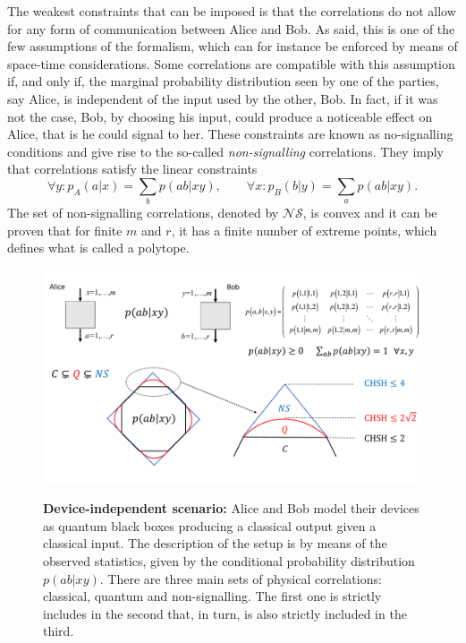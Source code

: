 \documentclass[a4paper]{article}
\begin{document}
The weakest constraints that can be imposed is that the correlations do not allow for any form of communication between Alice and Bob. As said, this is one of the few assumptions of the formalism, which can for instance be enforced by means of space-time considerations. Some correlations are compatible with this assumption if, and only if, the marginal probability distribution seen by one of the parties, say Alice, is independent of the input used by the other, Bob. In fact, if it was not the case, Bob, by choosing his input, could produce a noticeable effect on Alice, that is he could signal to her. These constraints  are known as no-signalling conditions and give rise to the so-called \emph{non-signalling} correlations. They imply that correlations satisfy the linear constraints
\begin{equation}
\label{nscorrelations}
\forall y: p_A(a|x)=\sum_b p(ab|xy), \quad\quad
\forall x: p_B(b|y)=\sum_a p(ab|xy).
\end{equation}
The set of non-signalling correlations, denoted by $\mathcal{NS}$, is convex and it can be proven that for finite $m$ and $r$, it has a finite number of extreme points, which defines what is called a polytope.

\begin{figure}
\begin{center}
  \includegraphics[width=12cm]{Correlations.pdf}\\
  \caption{\textbf{Device-independent scenario:} Alice and Bob model their devices as quantum black boxes producing a classical output given a classical input. The description of the setup is by means of the observed statistics, given by the conditional probability distribution $p(ab|xy)$. There are three main sets of physical correlations: classical, quantum and non-signalling. The first one is strictly includes in the second that, in turn, is also strictly included in the third.}\label{difig}
\end{center}
\end{figure}
\end{document}
